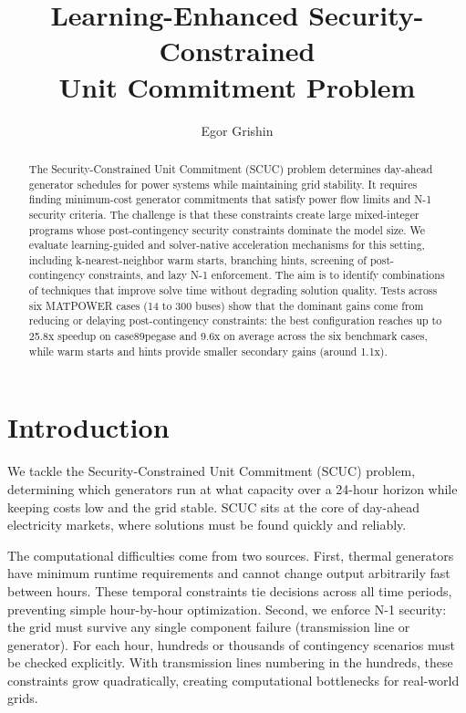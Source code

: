 \documentclass[runningheads]{llncs}
\title{Learning-Enhanced Security-Constrained\\ Unit Commitment Problem}
\author{Egor Grishin\inst{1}}
\institute{Skoltech, Moscow, Russia}
\begin{document}
\maketitle

\begin{abstract}
The Security-Constrained Unit Commitment (SCUC) problem determines day-ahead generator schedules for power systems while maintaining grid stability. It requires finding minimum-cost generator commitments that satisfy power flow limits and N-1 security criteria. The challenge is that these constraints create large mixed-integer programs whose post-contingency security constraints dominate the model size. We evaluate learning-guided and solver-native acceleration mechanisms for this setting, including k-nearest-neighbor warm starts, branching hints, screening of post-contingency constraints, and lazy N-1 enforcement. The aim is to identify combinations of techniques that improve solve time without degrading solution quality. Tests across six MATPOWER cases (14 to 300 buses) show that the dominant gains come from reducing or delaying post-contingency constraints: the best configuration reaches up to 25.8x speedup on case89pegase and 9.6x on average across the six benchmark cases, while warm starts and hints provide smaller secondary gains (around 1.1x).
\end{abstract}


\section{Introduction}
We tackle the Security-Constrained Unit Commitment (SCUC) problem, determining which generators run at what capacity over a 24-hour horizon while keeping costs low and the grid stable. SCUC sits at the core of day-ahead electricity markets, where solutions must be found quickly and reliably.

The computational difficulties come from two sources. First, thermal generators have minimum runtime requirements and cannot change output arbitrarily fast between hours. These temporal constraints tie decisions across all time periods, preventing simple hour-by-hour optimization. Second, we enforce N-1 security: the grid must survive any single component failure (transmission line or generator). For each hour, hundreds or thousands of contingency scenarios must be checked explicitly. With transmission lines numbering in the hundreds, these constraints grow quadratically, creating computational bottlenecks for real-world grids.
\end{document}
